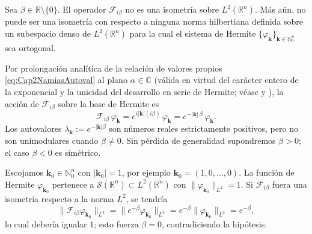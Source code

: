             \begin{proposition}\label{prop:noIsometriaL2}
                Sea $\beta \in \mathbb{R}\setminus\{0\}$. El operador $\mathcal{F}_{i\beta}$ no es una isometría sobre $L^2(\mathbb{R}^n)$. Más aún, no puede ser una isometría con respecto a ninguna norma hilbertiana definida sobre un subespacio denso de $L^2(\mathbb{R}^n)$ para la cual el sistema de Hermite $\{\varphi_{\boldsymbol{k}}\}_{\boldsymbol{k}\in\mathbb{N}_0^n}$ sea ortogonal.
            \end{proposition}
            \begin{Proof}
                Por prolongación analítica de la relación de valores propios \eqref{eq:Cap2NamiasAutoval} al plano $\alpha\in\mathbb{C}$ (válida en virtud del carácter entero de la exponencial y la unicidad del desarrollo en serie de Hermite; véase \citep[Ch.~1]{namias1980fractional} y \citep{kerr1988fractional}), la acción de $\mathcal{F}_{i\beta}$ sobre la base de Hermite es
                \begin{equation*}
                    \mathcal{F}_{i\beta}\,\varphi_{\boldsymbol{k}} = e^{i|\boldsymbol{k}|(i\beta)}\,\varphi_{\boldsymbol{k}} = e^{-|\boldsymbol{k}|\,\beta}\,\varphi_{\boldsymbol{k}}.
                \end{equation*}
                Los autovalores $\lambda_{\boldsymbol{k}} := e^{-|\boldsymbol{k}|\beta}$ son números reales estrictamente positivos, pero no son unimodulares cuando $\beta\neq 0$. Sin pérdida de generalidad supondremos $\beta>0$; el caso $\beta<0$ es simétrico.

                Escojamos $\boldsymbol{k}_0\in\mathbb{N}_0^n$ con $|\boldsymbol{k}_0|=1$, por ejemplo $\boldsymbol{k}_0=(1,0,\dots,0)$. La función de Hermite $\varphi_{\boldsymbol{k}_0}$ pertenece a $\mathcal{S}(\mathbb{R}^n)\subset L^2(\mathbb{R}^n)$ con $\|\varphi_{\boldsymbol{k}_0}\|_{L^2}=1$. Si $\mathcal{F}_{i\beta}$ fuera una isometría respecto a la norma $L^2$, se tendría
                \begin{equation*}
                    \|\mathcal{F}_{i\beta}\varphi_{\boldsymbol{k}_0}\|_{L^2} = \|e^{-\beta}\varphi_{\boldsymbol{k}_0}\|_{L^2} = e^{-\beta}\|\varphi_{\boldsymbol{k}_0}\|_{L^2} = e^{-\beta},
                \end{equation*}
                lo cual debería igualar $1$; esto fuerza $\beta=0$, contradiciendo la hipótesis.


\end{Proof}
